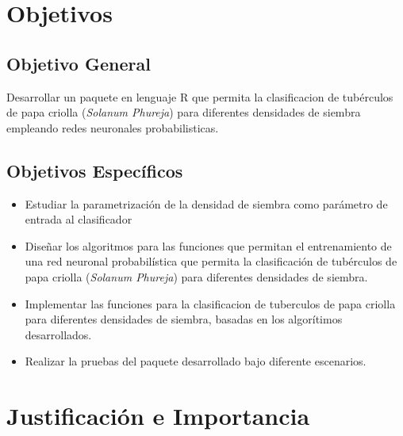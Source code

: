 \section{Objetivos}

\subsection{Objetivo General}

Desarrollar un paquete en lenguaje R que permita la clasificacion de tubérculos de papa criolla (\textit{Solanum Phureja}) para diferentes densidades de siembra empleando redes neuronales probabilisticas.

\subsection{Objetivos Espec\'ificos}
 
\begin{itemize}
\item{Estudiar la parametrizaci\'on de la densidad de siembra como par\'ametro de entrada al clasificador}
\item{Diseñar los algoritmos para las funciones que permitan el entrenamiento de una red neuronal probabilística que permita la clasificación de tubérculos de papa criolla (\textit{Solanum Phureja}) para diferentes densidades de siembra.}
\item{Implementar las funciones  para la clasificacion de tuberculos de papa criolla para diferentes densidades de siembra, basadas en los algorítimos desarrollados.}
\item{Realizar la pruebas del paquete desarrollado bajo diferente escenarios.}
\end{itemize}

\section{Justificaci\'on e Importancia}

